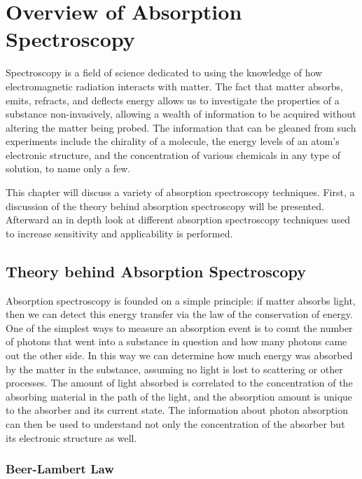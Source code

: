 \chapter{Overview of Absorption Spectroscopy}\label{ch:overview}

Spectroscopy is a field of science dedicated to using the knowledge of how
electromagnetic radiation interacts with matter. The fact that matter absorbs,
emits, refracts, and deflects energy allows us to investigate the properties of
a substance non-invasively, allowing a wealth of information to be acquired
without altering the matter being probed. The information that can be gleaned
from such experiments include the chirality of a molecule, the energy levels of
an atom's electronic structure, and the concentration of various chemicals in
any type of solution, to name only a few.

This chapter will discuss a variety of absorption spectroscopy techniques.
First, a discussion of the theory behind absorption spectroscopy will be
presented. Afterward an in depth look at different absorption spectroscopy
techniques used to increase sensitivity and applicability is performed.



\section{Theory behind Absorption Spectroscopy}\label{sec:abs_theory}

Absorption spectroscopy is founded on a simple principle: if matter absorbs
light, then we can detect this energy transfer via the law of the conservation
of energy. One of the simplest ways to measure an absorption event is to count
the number of photons that went into a substance in question and how many
photons came out the other side. In this way we can determine how much energy
was absorbed by the matter in the substance, assuming no light is lost to
scattering or other processes. The amount of light absorbed is correlated to
the concentration of the absorbing material in the path of the light, and the
absorption amount is unique to the absorber and its current state. The
information about photon absorption can then be used to understand not only the
concentration of the absorber but its electronic structure as well.



\subsection{Beer-Lambert Law}\label{subsec:beer}

